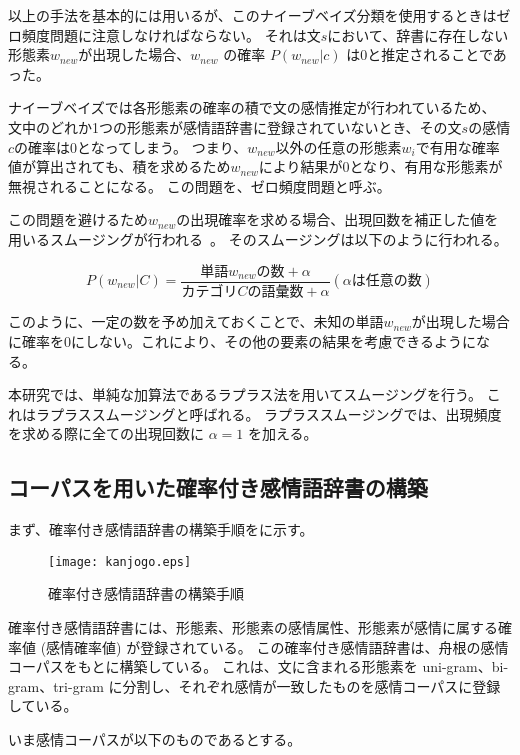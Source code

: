 \documentclass[11pt,a4j]{jsarticle}
\begin{document}
以上の手法を基本的には用いるが、このナイーブベイズ分類を使用するときはゼロ頻度問題に注意しなければならない。
それは文$s$において、辞書に存在しない形態素$w_\mathit{new}$が出現した場合、$w_\mathit{new}$ の確率 $P(w_\mathit{new}|c)$ は0と推定されることであった。

ナイーブベイズでは各形態素の確率の積で文の感情推定が行われているため、
文中のどれか1つの形態素が感情語辞書に登録されていないとき、その文$s$の感情$c$の確率は0となってしまう。
つまり、$w_\mathit{new}$以外の任意の形態素$w_i$で有用な確率値が算出されても、積を求めるため$w_\mathit{new}$により結果が0となり、有用な形態素が無視されることになる。
この問題を、ゼロ頻度問題と呼ぶ。

この問題を避けるため$w_\mathit{new}$の出現確率を求める場合、出現回数を補正した値を用いるスムージングが行われる~。
そのスムージングは以下のように行われる。

\[
  P(w_\mathit{new}|C)=\frac{単語 w_\mathit{new} の数 + \alpha }{カテゴリC の語彙数 + \alpha }(\alpha は任意の数)
\]

このように、一定の数を予め加えておくことで、未知の単語$w_\mathit{new}$が出現した場合に確率を0にしない。これにより、その他の要素の結果を考慮できるようになる。

本研究では、単純な加算法であるラプラス法を用いてスムージングを行う。
これはラプラススムージングと呼ばれる。
ラプラススムージングでは、出現頻度を求める際に全ての出現回数に $\alpha=1$ を加える。
 

  \subsection{コーパスを用いた確率付き感情語辞書の構築}\label{sec:tweetcorpus}
まず、確率付き感情語辞書の構築手順をに示す。

\begin{figure}[h]
  \texttt{[image: kanjogo.eps]}
  \caption{確率付き感情語辞書の構築手順}
  \label{fig:kanjogo}
\end{figure}

確率付き感情語辞書には、形態素、形態素の感情属性、形態素が感情に属する確率値 (感情確率値) が登録されている。
この確率付き感情語辞書は、舟根の感情コーパスをもとに構築している。
これは、文に含まれる形態素を uni-gram、bi-gram、tri-gram に分割し、それぞれ感情が一致したものを感情コーパスに登録している。

いま感情コーパスが以下のものであるとする。
\end{document}
